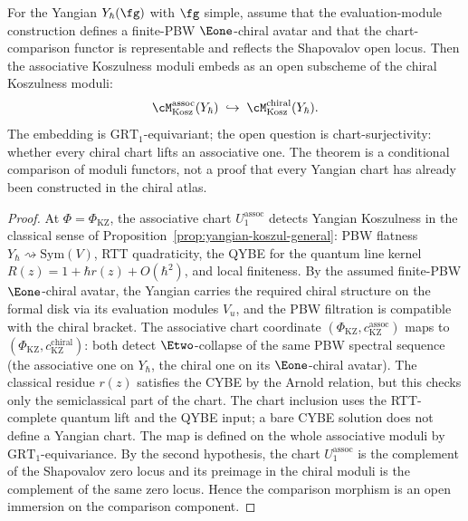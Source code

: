 \begin{theorem}
\label{thm:yangian-chart-inclusion-kp}
For the Yangian $Y_\hbar(\fg)$ with $\fg$ simple, assume that the
evaluation-module construction defines a finite-PBW $\Eone$-chiral
avatar and that the chart-comparison functor is representable and
reflects the Shapovalov open locus. Then the associative Koszulness
moduli embeds as an open subscheme of the chiral Koszulness moduli:
\[
\cM_{\mathrm{Kosz}}^{\mathrm{assoc}}(Y_\hbar)
\;\hookrightarrow\;
\cM_{\mathrm{Kosz}}^{\mathrm{chiral}}(Y_\hbar).
\]
The embedding is $\mathrm{GRT}_1$-equivariant; the open
question is chart-surjectivity: whether every
chiral chart lifts an associative one.
The theorem is a conditional comparison of moduli functors, not a
proof that every Yangian chart has already been constructed in the
chiral atlas.
\end{theorem}

\begin{proof}
At $\Phi = \Phi_{\mathrm{KZ}}$, the associative chart
$U_1^{\mathrm{assoc}}$ detects Yangian Koszulness in the
classical sense of
Proposition~\ref{prop:yangian-koszul-general}:
PBW flatness $Y_\hbar \rightsquigarrow \mathrm{Sym}(V)$,
RTT quadraticity, the QYBE for the quantum line kernel
$R(z)=1+\hbar r(z)+O(\hbar^2)$, and local finiteness.
By the assumed finite-PBW $\Eone$-chiral avatar, the Yangian carries
the required chiral structure on the formal disk via its evaluation
modules $V_u$, and the PBW filtration is compatible with the chiral
bracket. The associative chart coordinate
$(\Phi_{\mathrm{KZ}}, c^{\mathrm{assoc}}_{\mathrm{KZ}})$ maps to
$(\Phi_{\mathrm{KZ}}, c^{\mathrm{chiral}}_{\mathrm{KZ}})$: both
detect $\Etwo$-collapse of the same PBW spectral sequence (the
associative one on $Y_\hbar$, the chiral one on its
$\Eone$-chiral avatar). The classical residue $r(z)$ satisfies the
CYBE by the Arnold relation, but this checks only the semiclassical
part of the chart. The chart inclusion uses the RTT-complete quantum
lift and the QYBE input; a bare CYBE solution does not define a
Yangian chart. The map is defined on the whole
associative moduli by $\mathrm{GRT}_1$-equivariance.
By the second hypothesis, the chart $U_1^{\mathrm{assoc}}$ is the
complement of the Shapovalov zero locus and its preimage in the
chiral moduli is the complement of the same zero locus. Hence the
comparison morphism is an open immersion on the comparison component.
\end{proof}

